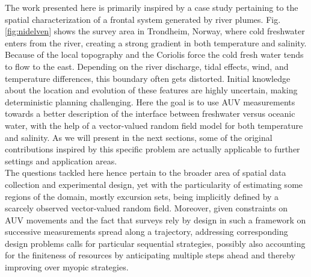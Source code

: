 \documentclass[aoas]{imsart}
\begin{document}
The work presented here is primarily inspired by a case study 
pertaining to the spatial characterization of a frontal system generated by
river plumes. Fig. \ref{fig:nidelven} shows the survey area in
Trondheim, Norway, where cold freshwater enters from the river,
creating a strong gradient in both temperature and salinity. Because
of the local topography and the Coriolis force the cold fresh water
tends to flow to the east. Depending on the river discharge, tidal
effects, wind, and temperature differences, this boundary often gets
distorted. Initial knowledge about the location and evolution of these
features are highly uncertain, making deterministic planning
challenging. Here the goal is to use AUV measurements towards a better description of the interface between freshwater versus oceanic water, with the help of a vector-valued random field model for both temperature and salinity. As we will present in the next sections, some of the original contributions inspired by this specific problem are actually applicable to further settings and application areas. \\

The questions tackled here hence pertain to the broader area of spatial data collection and experimental design, yet with the particularity of estimating some regions of the domain, mostly excursion sets, being implicitly defined by a scarcely observed vector-valued random field. 
Moreover, given constraints on AUV movements and the fact that surveys rely by design in such a framework on successive measurements spread along a trajectory, addressing corresponding design problems calls for particular sequential strategies, possibly also accounting for the finiteness of resources by anticipating multiple steps ahead and thereby improving over myopic strategies. \\
\end{document}
